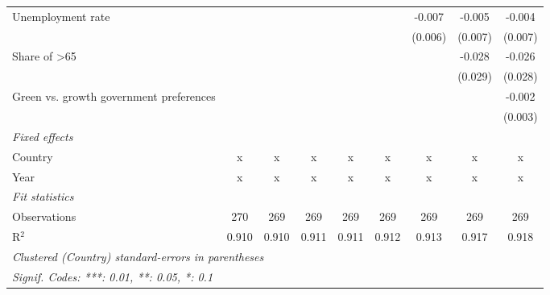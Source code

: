 \begin{table}[htbp]
\begin{tabular}{lcccccccc}
      Unemployment rate                                                 &         &         &         &         &         & -0.007  & -0.005  & -0.004\\   
                                                                        &         &         &         &         &         & (0.006) & (0.007) & (0.007)\\   
      Share of >65                                                      &         &         &         &         &         &         & -0.028  & -0.026\\   
                                                                        &         &         &         &         &         &         & (0.029) & (0.028)\\   
      Green vs. growth government preferences                           &         &         &         &         &         &         &         & -0.002\\   
                                                                        &         &         &         &         &         &         &         & (0.003)\\   
      \emph{Fixed effects}\\
      Country                                                           & x       & x       & x       & x       & x       & x       & x       & x\\  
      Year                                                              & x       & x       & x       & x       & x       & x       & x       & x\\  
      \midrule \emph{Fit statistics}\\
      Observations                                                      & 270     & 269     & 269     & 269     & 269     & 269     & 269     & 269\\  
      R$^2$                                                             & 0.910   & 0.910   & 0.911   & 0.911   & 0.912   & 0.913   & 0.917   & 0.918\\  
      \midrule
      \multicolumn{9}{l}{\emph{Clustered (Country) standard-errors in parentheses}}\\
      \multicolumn{9}{l}{\emph{Signif. Codes: ***: 0.01, **: 0.05, *: 0.1}}\\
   \end{tabular}
\end{table}


